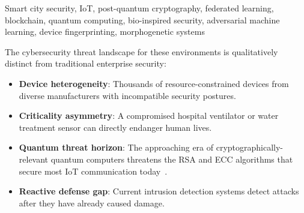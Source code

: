\documentclass[journal]{IEEEtran}
\begin{document}
\begin{IEEEkeywords}
Smart city security, IoT, post-quantum cryptography, federated learning,
blockchain, quantum computing, bio-inspired security, adversarial machine
learning, device fingerprinting, morphogenetic systems
\end{IEEEkeywords}

























The cybersecurity threat landscape for these environments is qualitatively
distinct from traditional enterprise security:

\begin{itemize}
  \item \textbf{Device heterogeneity}: Thousands of resource-constrained
        devices from diverse manufacturers with incompatible security postures.
  \item \textbf{Criticality asymmetry}: A compromised hospital ventilator or
        water treatment sensor can directly endanger human lives.
  \item \textbf{Quantum threat horizon}: The approaching era of
        cryptographically-relevant quantum computers threatens the RSA and
        ECC algorithms that secure most IoT communication today~\cite{ref_pqc_nist}.
  \item \textbf{Reactive defense gap}: Current intrusion detection systems
        detect attacks after they have already caused damage.
\end{itemize}
\end{document}
